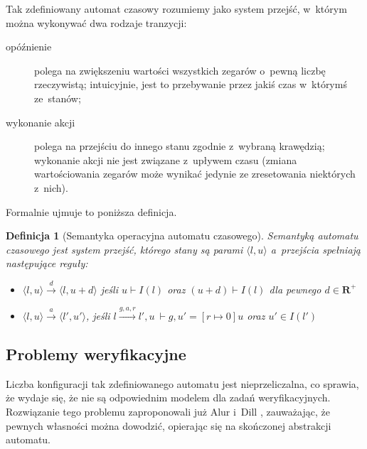 \documentclass{pracamgr}
\newcommand{\pair}[2]{\langle #1, #2 \rangle}
\theoremstyle{plain}
\newtheorem{definition}{Definicja}
\begin{document}
Tak zdefiniowany automat czasowy rozumiemy jako
system przejść, w~którym można wykonywać dwa rodzaje tranzycji:
\begin{description}
  \item[opóźnienie] polega na zwiększeniu wartości wszystkich zegarów
  o~pewną liczbę rzeczywistą; intuicyjnie, jest to przebywanie przez
  jakiś czas w~którymś ze~stanów;
  \item[wykonanie akcji] polega na przejściu do innego stanu
  zgodnie z~wybraną krawędzią; wykonanie akcji nie jest związane
  z~upływem czasu (zmiana wartościowania zegarów może wynikać jedynie
  ze zresetowania niektórych z~nich).
\end{description}
Formalnie ujmuje to poniższa definicja.
\begin{definition}[Semantyka operacyjna automatu czasowego] Semantyką
  automatu czasowego jest system przejść, którego stany są parami
  $\pair{l}{u}$ a~przejścia spełniają następujące reguły:
  \begin{itemize}
    \item $\pair{l}{u} \stackrel{d}{\longrightarrow} \pair{l}{u+d}$
    jeśli $u \vdash I(l)$ oraz $(u+d) \vdash I(l)$ dla pewnego $d \in
    \mathbf{R}^{+}$
    \item $\pair{l}{u} \stackrel{a}{\longrightarrow} \pair{l'}{u'}$,
    jeśli $l \stackrel{g, a, r}{\longrightarrow} l', u~\vdash g, u' =
    [r \mapsto 0]u$ oraz $u' \in I(l')$
  \end{itemize}
\end{definition}

\subsection{Problemy weryfikacyjne}

Liczba konfiguracji tak zdefiniowanego automatu jest nieprzeliczalna, co
sprawia, że wydaje się, że nie są odpowiednim modelem dla zadań
weryfikacyjnych. Rozwiązanie tego problemu zaproponowali już Alur
i~Dill \cite{alur-dill}, zauważając, że pewnych własności można dowodzić,
opierając się na skończonej abstrakcji automatu.
\end{document}
